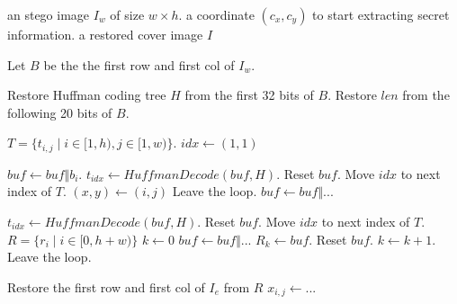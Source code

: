 \begin{algorithm}
	\caption{Data Extraction}
	
	\begin{algorithmic}[1]
		\Require an stego image $I_w$ of size $w \times h$.
		\Ensure a coordinate $(c_x, c_y)$ to start extracting secret information.
		\Ensure a restored cover image $I$
		
		\State Let $B$ be the the first row and first col of $I_w$.
		
		\State Restore Huffman coding tree $H$ from the first 32 bits of $B$.
		\State Restore $len$ from the following 20 bits of $B$.

		\State $T = \{t_{i, j} \mid i \in [1, h), j \in [1, w)\}$.
		\State $idx \gets (1, 1)$
		
			\State $buf \gets buf \Vert b_i$.
				\State $t_{idx} \gets HuffmanDecode(buf, H)$.
				\State Reset $buf$.
				\State Move $idx$ to next index of $T$.
			\EndIf
		\EndFor
		\ForAll{$\{t_{i, j} \mid t_{i, j} \in T, i \in [1, h), j \in [1, w)\}$}
				\State $(x, y) \gets (i, j)$
				\State Leave the loop.
			\EndIf
			\State $buf \gets buf \Vert ...$
			
				\State $t_{idx} \gets HuffmanDecode(buf, H)$.
				\State Reset $buf$.
				\State Move $idx$ to next index of $T$.
			\EndIf
		\EndFor
		\State $R = \{r_i \mid i \in [0, h + w)\}$
		\State $k \gets 0$
		\ForAll{$\{t_{i, j} \mid t_{i, j} \in T, (i = x \wedge j \in [y, w)) \vee (i \in (x, h), j \in [1, w))\}$}
			\State $buf \gets buf \Vert ...$
				\State $R_k \gets buf$.
				\State Reset $buf$.
				\State $k \gets k + 1$.
					\State Leave the loop.
				\EndIf
			\EndIf
		\EndFor
		
		\State Restore the first row and first col of $I_e$ from $R$
		\ForAll{$\{x_{i, j} \mid x_{i, j} \in I_e, i \in [1, h), j \in [1, w)\}$}
				\State $x_{i, j} \gets ...$
			\Else
			\EndIf
		\EndFor
	

	\end{algorithmic}
\end{algorithm}

